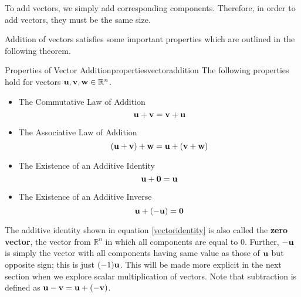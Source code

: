 To add vectors, we simply add corresponding components. Therefore, in order to add vectors, they must
be the same size.

Addition of vectors satisfies some important properties which are outlined in the following theorem.  

\begin{theorem}{Properties of Vector Addition}{propertiesvectoraddition}
The following properties hold for vectors ${\bf u},{\bf v}, {\bf w} \in \mathbb{R}^{n}$.
\begin{itemize}
\item The Commutative Law of Addition
\begin{equation*}
{\bf u}+{\bf v}={\bf v}+{\bf u}
\end{equation*}
\item The Associative Law of Addition
\begin{equation*}
\left( {\bf u}+{\bf v}\right) +{\bf w}={\bf u}+\left( {\bf v}+{\bf w}\right)
\end{equation*}
\item The Existence of an Additive Identity
\begin{equation}
{\bf u}+{\bf 0}={\bf u}
\label{vectoridentity} 
\end{equation}
\item The Existence of an Additive Inverse
\begin{equation*}
{\bf u}+\left( -{\bf u}\right) ={\bf 0}  
\end{equation*}
\end{itemize}
\end{theorem}

The additive identity shown in equation
\ref{vectoridentity} is also called the \textbf{zero vector}, 
the vector from $\mathbb{R}^{n}$ in which all components are equal to $0$.
Further, $-{\bf u}$ is simply the vector with all components having
same value as those of ${\bf u}$ but opposite sign; this is just
$(-1){\bf u}$. This will be made more explicit in the next
section when we explore scalar multiplication of vectors. Note that subtraction is defined as ${\bf u}-{\bf v} = {\bf u}+\left(
-{\bf v} \right)$.
